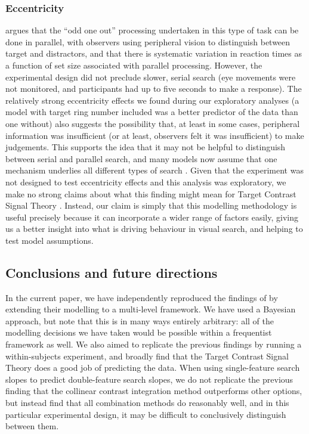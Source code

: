 \documentclass[preprint,12pt,authoryear]{elsarticle}
\begin{document}
\subsubsection{Eccentricity}

\citep{buetti2019predicting} argues that the ``odd one out'' processing undertaken in this type of task can be done in parallel, with observers using peripheral vision to distinguish between target and distractors, and that there is systematic variation in reaction times as a function of set size associated with parallel processing. However, the experimental design did not preclude slower, serial search (eye movements were not monitored, and participants had up to five seconds to make a response). The relatively strong eccentricity effects we found during our exploratory analyses (a model with target ring number included was a better predictor of the data than one without) also suggests the possibility that, at least in some cases, peripheral information was insufficient (or at least, observers felt it was insufficient) to make judgements. This supports the idea that it may not be helpful to distinguish between serial and parallel search, and many models now assume that one mechanism underlies all different types of search \citep{wolfe1998can, hulleman2017brink}. Given that the experiment was not designed to test eccentricity effects and this analysis was exploratory, we make no strong claims about what this finding might mean for Target Contrast Signal Theory \cite{lleras2020target}. Instead, our claim is simply that this modelling methodology is useful precisely because it can incorporate a wider range of factors easily, giving us a better insight into what is driving behaviour in visual search, and helping to test model assumptions.

\subsection{Conclusions and future directions}

In the current paper, we have independently reproduced the findings of \cite{buetti2019predicting} by extending their modelling to a multi-level framework. We have used a Bayesian approach, but note that this is in many ways entirely arbitrary: all of the modelling decisions we have taken would be possible within a frequentist framework as well. We also aimed to replicate the previous findings by running a within-subjects experiment, and broadly find that the Target Contrast Signal Theory does a good job of predicting the data. When using single-feature search slopes to predict double-feature search slopes, we do not replicate the previous finding that the collinear contrast integration method outperforms other options, but instead find that all combination methods do reasonably well, and in this particular experimental design, it may be difficult to conclusively distinguish between them.
\end{document}
